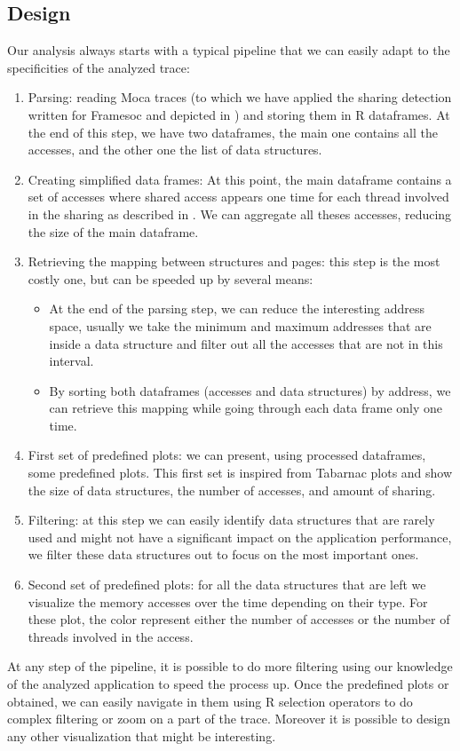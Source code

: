 \subsection{Design}

Our analysis always starts with a typical pipeline that we can easily adapt to the specificities of the analyzed trace:
\begin{enumerate}
    \item Parsing: reading \gls{Moca} traces (to which we have applied the sharing detection written for \gls{Framesoc} and depicted in )
        and storing them in \gls{R} dataframes.
        At the end of this step, we have two dataframes, the main one contains all the accesses, and the other one the list of data structures.
    \item Creating simplified data frames: At this point, the main dataframe contains a set of accesses where shared access appears one time for each thread involved in the sharing as described in .
        We can aggregate all theses accesses, reducing the size of the main dataframe.
    \item Retrieving the mapping between structures and pages: this step is the most costly one, but can be speeded up by several means:
        \begin{itemize}
            \item At the end of the parsing step, we can reduce the interesting address space, usually we take the minimum and maximum addresses that are inside a data structure and filter out all the accesses that are not in this interval.
            \item By sorting both dataframes (accesses and data structures) by address, we can retrieve this mapping while going through each data frame only one time.
        \end{itemize}
    \item First set of predefined plots: we can present, using processed dataframes, some predefined  plots. This first set is inspired from \gls{Tabarnac} plots and show the size of data structures, the number of accesses, and amount of sharing.
    \item  Filtering: at this step we can easily identify data structures that are rarely used and might not have a significant impact on the application performance, we filter these data structures out to focus on the most important ones.
    \item Second set of predefined plots: for all the data structures that are left we visualize the memory accesses over the time depending on their type.
        For these plot, the color represent either the number of accesses or the number of threads involved in the access.
\end{enumerate}
At any step of the pipeline, it is possible to do more filtering using our knowledge of the analyzed application to speed the process up.
Once the predefined plots or obtained, we can easily navigate in them using \gls{R} selection operators to do complex filtering or zoom on a part of the trace.
Moreover it is possible to design any other visualization that might be interesting.

